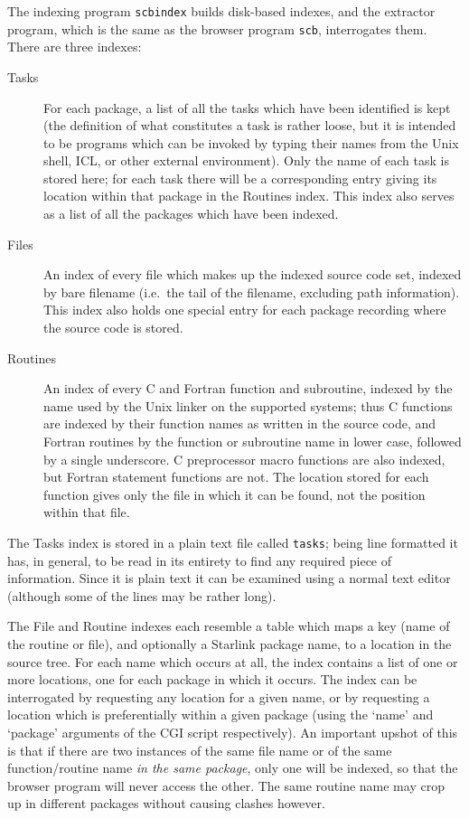 \documentclass[twoside,11pt]{article}
\renewcommand{\_}{\texttt{\symbol{95}}}
\begin{document}
The indexing program {\tt scbindex} builds disk-based indexes, and the 
extractor program, which is the same as the browser program  {\tt scb},
interrogates them.  There are three indexes:
\begin{description}
\item[Tasks]
For each package, a list of all the tasks which have been identified
is kept (the definition of what constitutes a task is rather 
loose, but it is intended to be programs which can be invoked by
typing their names from the Unix shell, ICL, or other external
environment).
Only the name of each task is stored here; 
for each task there will be a corresponding entry giving its location within
that package in the Routines index.
This index also serves as a list of all the
packages which have been indexed.
%
\item[Files]
An index of every file which makes up the indexed source code set,
indexed by bare filename (i.e.\ the tail of the filename, excluding
path information). 
This index also holds one special entry for each package 
recording where the source code is stored.
%
\item[Routines]
An index of every C and Fortran function and subroutine, 
indexed by the name used by the Unix linker on the supported systems;
thus C functions are indexed by their function names 
as written in the source code, and Fortran routines by the function 
or subroutine name in lower case, followed by a single underscore.
C preprocessor macro functions are also indexed,
but Fortran statement functions are not.
The location stored for each function gives only the file in
which it can be found, not the position within that file.
\end{description}

The Tasks index is stored in a plain text file called {\tt tasks};
being line formatted it has, in general, 
to be read in its entirety to find any
required piece of information.
Since it is plain text 
it can be examined using a normal text editor 
(although some of the lines may be rather long).

The File and Routine indexes
each resemble a table which
maps a key (name of the routine or file), and optionally a 
Starlink package name, to a location in the source tree. 
For each name which occurs at all,
the index contains a list of one or more locations, 
one for each package in which it occurs.
The index can be interrogated by requesting any location for a given name,
or by requesting a location which is preferentially within a given package
(using the `name' and `package' arguments of the CGI script respectively).
An important upshot of this is that if there are two instances of
the same file name or of the same function/routine name 
{\em in the same package\/}, only one will be indexed, so that the
browser program will never access the other.
The same routine name may crop up in different packages without causing
clashes however.
\end{document}

